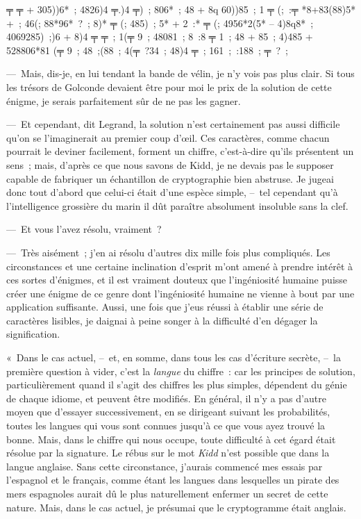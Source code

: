 \documentclass[french,twoside]{book} %
\newenvironment{quoteblock}%
  {\begin{quoting}}
  {\end{quoting}}
\newenvironment{quotebar}{%
    \def\FrameCommand{{\color{rubric!10!}\vrule width 0.5em} \hspace{0.9em}}%
    \def\OuterFrameSep{\itemsep} %
    \MakeFramed {\advance\hsize-\width \FrameRestore}
  }%
  {%
    \endMakeFramed
  }
\renewenvironment{quoteblock}%
  {%
    \savenotes
    \setstretch{0.9}
    \normalfont
    \begin{quotebar}
  }
  {%
    \end{quotebar}
    \spewnotes
  }
\begin{document}
\begin{quoteblock}
 ╤ ╤ + 305))6* ; 4826)4 ╤.)4 ╤) ; 806* ; 48 + 8q 60))85 ; 1 ╤ (; :╤ *8+83(88)5* + ; 46(; 88*96* ? ; 8)* ╤ (; 485) ; 5* + 2 :* ╤ (; 4956*2(5* – 4)8q8* ; 4069285) ;)6 + 8)4 ╤ ╤ ; 1(╤ 9 ; 48081 ; 8 :8 ╤ 1 ; 48 + 85 ; 4)485 + 528806*81 (╤ 9 ; 48 ;(88 ; 4(╤ ?34 ; 48)4 ╤ ; 161 ; :188 ; ╤ ? ;\end{quoteblock}

\noindent — Mais, dis-je, en lui tendant la bande de vélin, je n’y vois pas plus clair. Si tous les trésors de Golconde devaient être pour moi le prix de la solution de cette énigme, je serais parfaitement sûr de ne pas les gagner.\par
— Et cependant, dit Legrand, la solution n’est certainement pas aussi difficile qu’on se l’imaginerait au premier coup d’œil. Ces caractères, comme chacun pourrait le deviner facilement, forment un chiffre, c’est-à-dire qu’ils présentent un sens ; mais, d’après ce que nous savons de Kidd, je ne devais pas le supposer capable de fabriquer un échantillon de cryptographie bien abstruse. Je jugeai donc tout d’abord que celui-ci était d’une espèce simple, – tel cependant qu’à l’intelligence grossière du marin il dût paraître absolument insoluble sans la clef.\par
— Et vous l’avez résolu, vraiment ?\par
— Très aisément ; j’en ai résolu d’autres dix mille fois plus compliqués. Les circonstances et une certaine inclination d’esprit m’ont amené à prendre intérêt à ces sortes d’énigmes, et il est vraiment douteux que l’ingéniosité humaine puisse créer une énigme de ce genre dont l’ingéniosité humaine ne vienne à bout par une application suffisante. Aussi, une fois que j’eus réussi à établir une série de caractères lisibles, je daignai à peine songer à la difficulté d’en dégager la signification.\par
« Dans le cas actuel, – et, en somme, dans tous les cas d’écriture secrète, – la première question à vider, c’est la \emph{langue} du chiffre : car les principes de solution, particulièrement quand il s’agit des chiffres les plus simples, dépendent du génie de chaque idiome, et peuvent être modifiés. En général, il n’y a pas d’autre moyen que d’essayer successivement, en se dirigeant suivant les probabilités, toutes les langues qui vous sont connues jusqu’à ce que vous ayez trouvé la bonne. Mais, dans le chiffre qui nous occupe, toute difficulté à cet égard était résolue par la signature. Le rébus sur le mot\emph{ Kidd} n’est possible que dans la langue anglaise. Sans cette circonstance, j’aurais commencé mes essais par l’espagnol et le français, comme étant les langues dans lesquelles un pirate des mers espagnoles aurait dû le plus naturellement enfermer un secret de cette nature. Mais, dans le cas actuel, je présumai que le cryptogramme était anglais.\par
\end{document}

